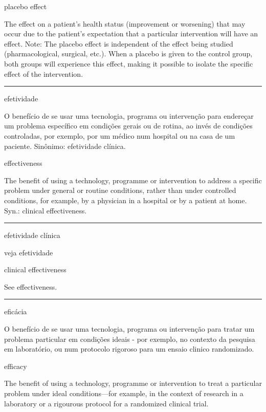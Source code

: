 \documentclass[
]{book}
\begin{document}
placebo effect

The effect on a patient's health status (improvement or worsening) that may occur due to the patient's expectation that a particular intervention will have an effect. Note: The placebo effect is independent of the effect being studied (pharmacological, surgical, etc.). When a placebo is given to the control group, both groups will experience this effect, making it possible to isolate the specific effect of the intervention.

\begin{center}\rule{0.5\linewidth}{0.5pt}\end{center}

efetividade

O benefício de se usar uma tecnologia, programa ou intervenção para endereçar um problema específico em condições gerais ou de rotina, ao invés de condições controladas, por exemplo, por um médico num hospital ou na casa de um paciente. Sinônimo: efetividade clínica.

effectiveness

The benefit of using a technology, programme or intervention to address a specific problem under general or routine conditions, rather than under controlled conditions, for example, by a physician in a hospital or by a patient at home. Syn.: clinical effectiveness.

\begin{center}\rule{0.5\linewidth}{0.5pt}\end{center}

efetividade clínica

veja efetividade

clinical effectiveness

See effectiveness.

\begin{center}\rule{0.5\linewidth}{0.5pt}\end{center}

eficácia

O benefício de se usar uma tecnologia, programa ou intervenção para tratar um problema particular em condições ideais - por exemplo, no contexto da pesquisa em laboratório, ou num protocolo rigoroso para um ensaio clinico randomizado.

efficacy

The benefit of using a technology, programme or intervention to treat a particular problem under ideal conditions---for example, in the context of research in a laboratory or a rigourous protocol for a randomized clinical trial.
\end{document}

